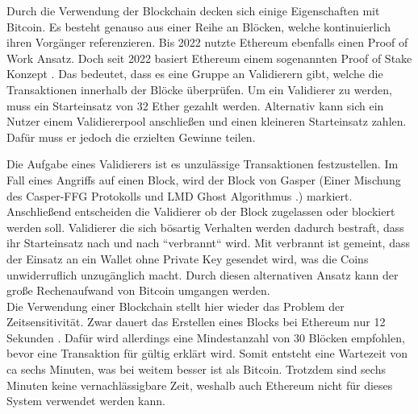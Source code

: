 \documentclass{scrreprt}
\begin{document}
Durch die Verwendung der Blockchain decken sich einige Eigenschaften mit Bitcoin. Es besteht genauso aus einer Reihe an Blöcken, welche kontinuierlich ihren Vorgänger referenzieren. Bis 2022 nutzte Ethereum ebenfalls einen Proof of Work Ansatz. Doch seit 2022 basiert Ethereum einem sogenannten Proof of Stake Konzept \cite{eth-explainerInvestopia}. Das bedeutet, dass es eine Gruppe an Validierern gibt, welche die Transaktionen innerhalb der Blöcke überprüfen. Um ein Validierer zu werden, muss ein Starteinsatz von 32 Ether gezahlt werden. Alternativ kann sich ein Nutzer einem Validiererpool anschließen und einen kleineren Starteinsatz zahlen. Dafür muss er jedoch die erzielten Gewinne teilen. 

Die Aufgabe eines Validierers ist es unzulässige Transaktionen festzustellen. Im Fall eines Angriffs auf einen Block, wird der Block von Gasper (Einer Mischung des Casper-FFG Protokolls und LMD Ghost Algorithmus \cite{eth-buterin2020combining}.) markiert. Anschließend entscheiden die Validierer ob der Block zugelassen oder blockiert werden soll. Validierer die sich bösartig Verhalten werden dadurch bestraft, dass ihr Starteinsatz nach und nach ``verbrannt`` wird. Mit verbrannt ist gemeint, dass der Einsatz an ein Wallet ohne Private Key gesendet wird, was die Coins unwiderruflich unzugänglich macht. Durch diesen alternativen Ansatz kann der große Rechenaufwand von Bitcoin umgangen werden.\\

Die Verwendung einer Blockchain stellt hier wieder das Problem der Zeitsensitivität. Zwar dauert das Erstellen eines Blocks bei Ethereum nur 12 Sekunden \cite{eth-timePerBlock}. Dafür wird allerdings eine Mindestanzahl von 30 Blöcken empfohlen, bevor eine Transaktion für gültig erklärt wird. Somit entsteht eine Wartezeit von ca sechs Minuten, was bei weitem besser ist als Bitcoin. Trotzdem sind sechs Minuten keine vernachlässigbare Zeit, weshalb auch Ethereum nicht für dieses System verwendet werden kann.
\end{document}
